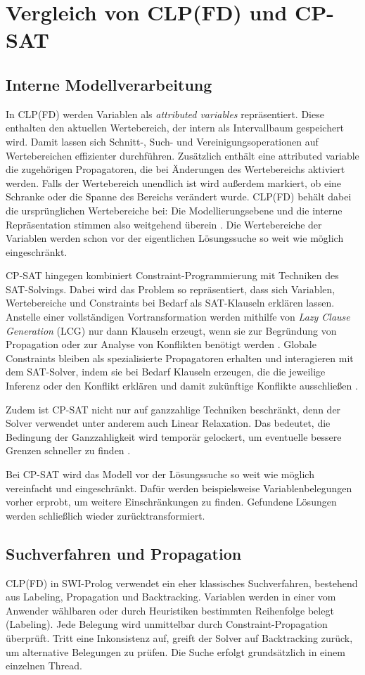 \documentclass[12pt,a4paper]{article}
\begin{document}
\section{Vergleich von CLP(FD) und CP-SAT}
\subsection{Interne Modellverarbeitung}
In CLP(FD) werden Variablen als \emph{attributed variables} repräsentiert. 
Diese enthalten den aktuellen Wertebereich, der intern als Intervallbaum gespeichert wird. 
Damit lassen sich Schnitt-, Such- und Vereinigungsoperationen auf Wertebereichen effizienter durchführen. 
Zusätzlich enthält eine attributed variable die zugehörigen Propagatoren, die bei Änderungen des Wertebereichs aktiviert werden. 
Falls der Wertebereich unendlich ist wird außerdem markiert, ob eine Schranke oder die Spanne des Bereichs verändert wurde.
CLP(FD) behält dabei die ursprünglichen Wertebereiche bei: Die Modellierungsebene und die interne Repräsentation stimmen also weitgehend überein \cite{drt}.
Die Wertebereiche der Variablen werden schon vor der eigentlichen Lösungssuche so weit wie möglich eingeschränkt.

CP-SAT hingegen kombiniert Constraint-Programmierung mit Techniken des SAT-Solvings.
Dabei wird das Problem so repräsentiert, dass sich Variablen, Wertebereiche und Constraints bei Bedarf als SAT-Klauseln erklären lassen.
Anstelle einer vollständigen Vortransformation werden mithilfe von \emph{Lazy Clause Generation} (LCG) nur dann Klauseln erzeugt, wenn sie zur Begründung von Propagation oder zur Analyse von Konflikten benötigt werden \cite{Stuckey2010}.
Globale Constraints bleiben als spezialisierte Propagatoren erhalten und interagieren mit dem SAT-Solver, indem sie bei Bedarf Klauseln erzeugen, die die jeweilige Inferenz oder den Konflikt erklären und damit zukünftige Konflikte ausschließen \cite{cp-sat-primer}.

Zudem ist CP-SAT nicht nur auf ganzzahlige Techniken beschränkt, denn der Solver verwendet unter anderem auch Linear Relaxation.
Das bedeutet, die Bedingung der Ganzzahligkeit wird temporär gelockert, um eventuelle bessere Grenzen schneller zu finden \cite{cp-sat-primer}.

Bei CP-SAT wird das Modell vor der Lösungssuche so weit wie möglich vereinfacht und eingeschränkt.
Dafür werden beispielsweise Variablenbelegungen vorher erprobt, um weitere Einschränkungen zu finden.
Gefundene Lösungen werden schließlich wieder zurücktransformiert.
\subsection{Suchverfahren und Propagation}
\label{sec:search_prop}
CLP(FD) in SWI-Prolog verwendet ein eher \glqq klassisches\grqq{} Suchverfahren, bestehend aus Labeling, Propagation und Backtracking.
Variablen werden in einer vom Anwender wählbaren oder durch Heuristiken bestimmten Reihenfolge belegt (Labeling).
Jede Belegung wird unmittelbar durch Constraint-Propagation überprüft.
Tritt eine Inkonsistenz auf, greift der Solver auf Backtracking zurück, um alternative Belegungen zu prüfen.
Die Suche erfolgt grundsätzlich in einem einzelnen Thread.
\end{document}
